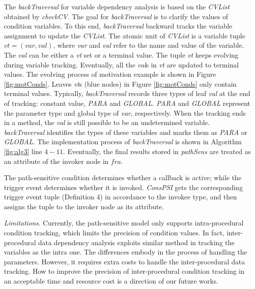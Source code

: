 The \textit{backTraversal} for variable dependency analysis is based on the \textit{CVList} obtained by \textit{checkCV}. The goal for \textit{backTraversal} is to clarify the values of condition variables. To this end, \textit{backTraversal} backward tracks the variable assignment to update the \textit{CVList}. The atomic unit of \textit{CVList} is a variable tuple $\textit{vt} = (var, val)$, where \textit{var} and \textit{val} refer to the name and value of the variable. The \textit{val} can be either a \textit{vt} set or a terminal value. The tuple \textit{vt} keeps evolving during variable tracking. Eventually, all the \textit{val}s in \textit{vt} are updated to terminal values. The evolving process of motivation example is shown in Figure \ref{fig:motConds}. Leaves \textit{vt}s (blue nodes) in Figure \ref{fig:motConds} only contain terminal values. Typically, \textit{backTraversal} records three types of leaf \textit{val} at the end of tracking: constant value, \textit{PARA} and \textit{GLOBAL}. \textit{PARA} and \textit{GLOBAL} represent the parameter type and global type of \textit{var}, respectively. When the tracking ends in a method, the \textit{val} is still possible to be an undetermined variable. \textit{backTraversal} identifies the types of these variables and marks them as \textit{PARA} or \textit{GLOBAL}. The implementation process of \textit{backTraversal} is shown in Algorithm \ref{fig:alg3} line $4-11$. Eventually, the final results stored in \textit{pathSens} are treated as an attribute of the invoker node in $fra$.



The path-sensitive condition determines whether a callback is active; while the trigger event determines whether it is invoked.
\textit{ConsPSI} gets the corresponding trigger event tuple (Definition 4) in accordance to the invokee type, and then assigns the tuple to the invoker node as its attribute. 


\textit{Limitations.}
Currently, the path-sensitive model only supports intra-procedural condition tracking, which limits the precision of condition values. In fact, inter-procedural data dependency analysis exploits similar method in tracking the variables as the intra one. The differences embody in the process of handling the parameters. However, it requires extra costs to handle the inter-procedural data tracking. How to improve the precision of inter-procedural condition tracking in an acceptable time and resource cost is a direction of our future works.


